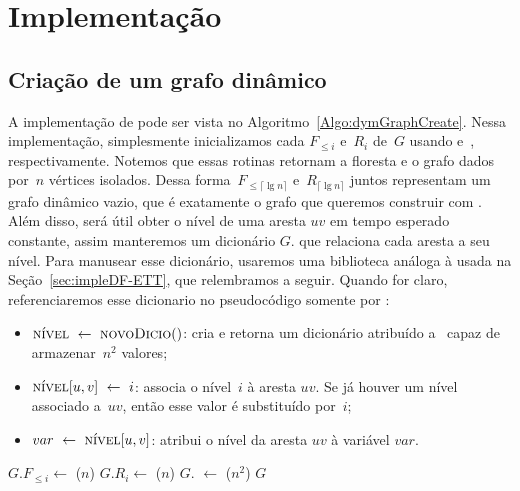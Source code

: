 \section{Implementação}
\subsection{Criação de um grafo dinâmico}

A implementação de \dymGraphCreate{} pode ser vista no Algoritmo~\ref{Algo:dymGraphCreate}. Nessa implementação, simplesmente inicializamos cada $F_{\leqslant i}$ e~$R_i$ de~$G$ usando \dymForestCreate{} e~\graphCreate{}, respectivamente. Notemos que essas rotinas retornam a floresta e o grafo dados por~$n$ vértices isolados. Dessa forma~$F_{\leqslant \lceil \lg n \rceil}$ e~$R_{\lceil \lg n \rceil}$ juntos representam um grafo dinâmico vazio, que é exatamente o grafo que queremos construir com \dymGraphCreate{}. Além disso, será útil obter o nível de uma aresta $uv$ em tempo esperado constante, assim manteremos um dicionário $G$.\nivel{} que relaciona cada aresta a seu nível. Para manusear esse dicionário, usaremos uma biblioteca análoga à usada na Seção~\ref{sec:impleDF-ETT}, que relembramos a seguir. Quando for claro, referenciaremos esse dicionario no pseudocódigo somente por \nivel:
\begin{itemize}
    \item $\nivel~\gets~\hashCreate()$: cria e retorna um dicionário atribuído a~\nivel{} capaz de armazenar~$n^2$ valores;
    \item $\nivel[u,v]~\gets~i$: associa o nível~$i$ à aresta $uv$. Se já houver um nível associado a~$uv$, então esse valor é substituído por~$i$;
    \item $var~\gets~\nivel[u,v]$: atribui o nível da aresta $uv$ à variável $var$.
\end{itemize}

\begin{algorithm}
\caption{\dymGraphCreate($n$)}
\label{Algo:dymGraphCreate}
\begin{algorithmic}[1]
\State $G.F_{\leqslant i} \gets$ \dymForestCreate($n$)
\State $G.R_i \gets$ \graphCreate($n$)
\EndFor
\State $G$.\nivel{} $\gets$ \hashCreate($n^2$)
\State \Return $G$ 
\end{algorithmic}
\end{algorithm}


